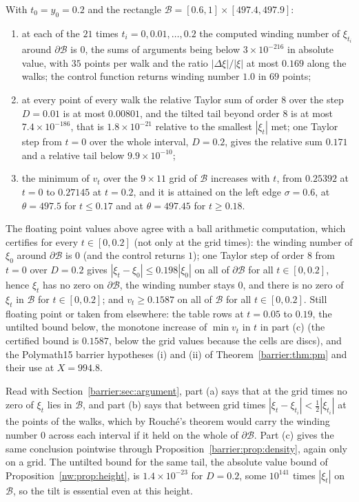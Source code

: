\begin{proposition}\label{barrier:prop:check}
With $t_0=y_0=0.2$ and the rectangle $\mathcal B=[0.6,1]\times[497.4,497.9]$:
\begin{enumerate}
\item[(a)] at each of the $21$ times $t_i=0,0.01,\dots,0.2$ the computed winding number of $\xi_{t_i}$ around $\partial\mathcal B$ is $0$, the sums of arguments being below $3\times10^{-216}$ in absolute value, with $35$ points per walk and the ratio $|\Delta\xi|/|\xi|$ at most $0.169$ along the walks; the control function returns winding number $1.0$ in $69$ points;
\item[(b)] at every point of every walk the relative Taylor sum of order $8$ over the step $D=0.01$ is at most $0.00801$, and the tilted tail beyond order $8$ is at most $7.4\times10^{-186}$, that is $1.8\times10^{-21}$ relative to the smallest $|\xi_t|$ met; one Taylor step from $t=0$ over the whole interval, $D=0.2$, gives the relative sum $0.171$ and a relative tail below $9.9\times10^{-10}$;
\item[(c)] the minimum of $v_t$ over the $9\times11$ grid of $\mathcal B$ increases with $t$, from $0.25392$ at $t=0$ to $0.27145$ at $t=0.2$, and it is attained on the left edge $\sigma=0.6$, at $\theta=497.5$ for $t\le0.17$ and at $\theta=497.45$ for $t\ge0.18$.
\end{enumerate}
The floating point values above agree with a ball arithmetic computation, which certifies for every $t\in[0,0.2]$ (not only at the grid times): the winding number of $\xi_0$ around $\partial\mathcal B$ is $0$ (and the control returns $1$); one Taylor step of order $8$ from $t=0$ over $D=0.2$ gives $|\xi_t-\xi_0|\le0.198|\xi_0|$ on all of $\partial\mathcal B$ for all $t\in[0,0.2]$, hence $\xi_t$ has no zero on $\partial\mathcal B$, the winding number stays $0$, and there is no zero of $\xi_t$ in $\mathcal B$ for $t\in[0,0.2]$; and $v_t\ge0.1587$ on all of $\mathcal B$ for all $t\in[0,0.2]$. Still floating point or taken from elsewhere: the table rows at $t=0.05$ to $0.19$, the untilted bound below, the monotone increase of $\min v_t$ in $t$ in part (c) (the certified bound is $0.1587$, below the grid values because the cells are discs), and the Polymath15 barrier hypotheses (i) and (ii) of Theorem~\ref{barrier:thm:pm} and their use at $X=994.8$.
\end{proposition}

Read with Section~\ref{barrier:sec:argument}, part (a) says that at the grid times no zero of $\xi_t$ lies in $\mathcal B$, and part (b) says that between grid times $|\xi_t-\xi_{t_i}|<\frac12|\xi_{t_i}|$ at the points of the walks, which by Rouch\'e's theorem would carry the winding number $0$ across each interval if it held on the whole of $\partial\mathcal B$. Part (c) gives the same conclusion pointwise through Proposition~\ref{barrier:prop:density}, again only on a grid. The untilted bound for the same tail, the absolute value bound of Proposition~\ref{nw:prop:height}, is $1.4\times10^{-23}$ for $D=0.2$, some $10^{141}$ times $|\xi_t|$ on $\mathcal B$, so the tilt is essential even at this height.

